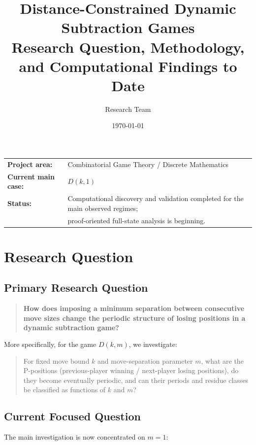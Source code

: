 \documentclass[11pt]{article}
\title{\textbf{Distance-Constrained Dynamic Subtraction Games}\\[0.4em]
\large Research Question, Methodology, and Computational Findings to Date}
\author{Research Team}
\date{\today}
\begin{document}
\maketitle

\begin{center}
\begin{tabular}{@{}ll@{}}
\textbf{Project area:} & Combinatorial Game Theory / Discrete Mathematics \\
\textbf{Current main case:} & $D(k,1)$ \\
\textbf{Status:} & Computational discovery and validation completed for the main observed regimes; \\
& proof-oriented full-state analysis is beginning.
\end{tabular}
\end{center}

\tableofcontents
\newpage

\section{Research Question}

\subsection{Primary Research Question}

\begin{quote}
\textbf{How does imposing a minimum separation between consecutive move sizes change the periodic structure of losing positions in a dynamic subtraction game?}
\end{quote}

More specifically, for the game $D(k,m)$, we investigate:

\begin{quote}
For fixed move bound $k$ and move-separation parameter $m$, what are the P-positions (previous-player winning / next-player losing positions), do they become eventually periodic, and can their periods and residue classes be classified as functions of $k$ and $m$?
\end{quote}

\subsection{Current Focused Question}

The main investigation is now concentrated on $m=1$:
\end{document}
